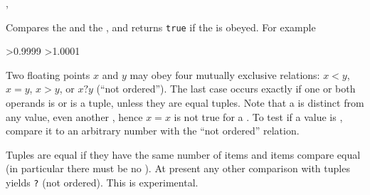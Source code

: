 \documentclass[oneside]{book}
\begin{document}
\begin{function}{\FpCompare,\FpCompareTF}
\begin{syntax}
   
     
\end{syntax}
Compares the  and the , and returns
\texttt{true} if the  is obeyed. For example
\begin{demohigh}
>{0.9999}{}{}
>{1.0001}{}{}
\end{demohigh}
Two floating points
$x$ and $y$ may obey four mutually exclusive relations:
$x<y$, $x=y$, $x>y$, or $x?y$ (\enquote{not ordered}).  The last
case occurs exactly if one or both operands is \nan{} or is a tuple,
unless they are equal tuples.  Note that a \nan{} is distinct from
any value, even another \nan{}, hence $x=x$ is not true for
a \nan{}.  To test if a value is \nan{}, compare it to an arbitrary
number with the \enquote{not ordered} relation.\par
Tuples are equal if they have the same number of items and items
compare equal (in particular there must be no \nan{}).
At present any other comparison with tuples yields \verb|?| (not ordered).
This is experimental.
\end{function}
\end{document}
